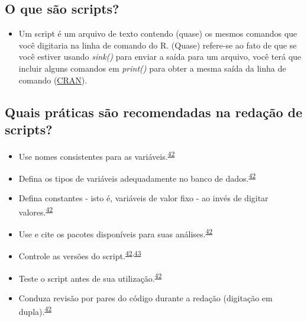 \documentclass[
]{book}
\providecommand{\tightlist}{%
  \setlength{\itemsep}{0pt}\setlength{\parskip}{0pt}}
\begin{document}
\hypertarget{o-que-suxe3o-scripts}{%
\subsection{O que são scripts?}\label{o-que-suxe3o-scripts}}

\begin{itemize}
\tightlist
\item
  Um script é um arquivo de texto contendo (quase) os mesmos comandos que você digitaria na linha de comando do R. (Quase) refere-se ao fato de que se você estiver usando \emph{sink()} para enviar a saída para um arquivo, você terá que incluir alguns comandos em \emph{print()} para obter a mesma saída da linha de comando (\href{https://cran.r-project.org/doc/contrib/Lemon-kickstart/kr_scrpt.html}{CRAN}).
\end{itemize}

\hypertarget{quais-pruxe1ticas-suxe3o-recomendadas-na-redauxe7uxe3o-de-scripts}{%
\subsection{Quais práticas são recomendadas na redação de scripts?}\label{quais-pruxe1ticas-suxe3o-recomendadas-na-redauxe7uxe3o-de-scripts}}

\begin{itemize}
\item
  Use nomes consistentes para as variáveis.\textsuperscript{\protect\hyperlink{ref-SchwabSimon2021}{42}}
\item
  Defina os tipos de variáveis adequadamente no banco de dados.\textsuperscript{\protect\hyperlink{ref-SchwabSimon2021}{42}}
\item
  Defina constantes - isto é, variáveis de valor fixo - ao invés de digitar valores.\textsuperscript{\protect\hyperlink{ref-SchwabSimon2021}{42}}
\item
  Use e cite os pacotes disponíveis para suas análises.\textsuperscript{\protect\hyperlink{ref-SchwabSimon2021}{42}}
\item
  Controle as versões do script.\textsuperscript{\protect\hyperlink{ref-SchwabSimon2021}{42},\protect\hyperlink{ref-Eglen2017}{43}}
\item
  Teste o script antes de sua utilização.\textsuperscript{\protect\hyperlink{ref-SchwabSimon2021}{42}}
\item
  Conduza revisão por pares do código durante a redação (digitação em dupla).\textsuperscript{\protect\hyperlink{ref-SchwabSimon2021}{42}}
\end{itemize}
\end{document}

